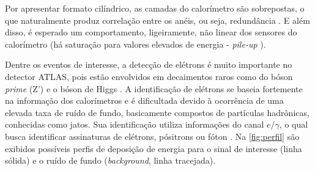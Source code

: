 Por apresentar formato cilíndrico, as camadas do calorímetro são sobrepostas, o que naturalmente produz correlação entre os anéis, ou seja, redundância \cite{brumfiel2012}. E além disso, é esperado um comportamento, ligeiramente, não linear dos sensores do calorímetro (há saturação para valores elevados de energia - \textit{pile-up} \cite{werner2016, wigmans2008}).

Dentre os eventos de interesse, a detecção de elétrons é muito importante no detector ATLAS, pois estão envolvidos em decaimentos raros como do bóson \textit{prime} (Z') e o bóson de Higgs \cite{werner2016}. A identificação de elétrons se baseia fortemente na informação dos calorímetros e é dificultada devido à ocorrência de uma elevada taxa de ruído de fundo, basicamente compostos de partículas hadrônicas, conhecidas como jatos. Sua identificação utiliza informações do canal $e/\gamma$, o qual busca identificar assinaturas de elétrons, pósitrons ou fóton \cite[p 76]{tcc:werner2011}.  Na \autoref{fig:perfil} são exibidos possíveis perfis de deposição de energia para o sinal de interesse (linha sólida) e o ruído de fundo (\textit{background}, linha tracejada).

%
%

